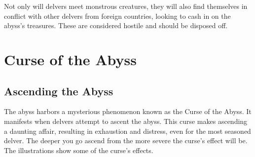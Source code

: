 \documentclass[letterpaper,10pt,twoside,twocolumn,openany]{book}
\begin{document}
Not only will delvers meet monstrous creatures, they will also find themselves in conflict with other delvers from foreign countries, looking to cash in on the abyss's treasures. These are considered hostile and should be disposed off.

\newpage
\begin{figure}[t]
\end{figure}

\chapter{Curse of the Abyss}

\section{Ascending the Abyss}
The abyss harbors a mysterious phenomenon known as the Curse of the Abyss. It manifests when delvers attempt to ascent the abyss. This curse makes ascending a daunting affair, resulting in exhaustion and distress, even for the most seasoned delver. The deeper you go ascend from the more severe the curse's effect will be. The illustrations show some of the curse's effects.
\end{document}
